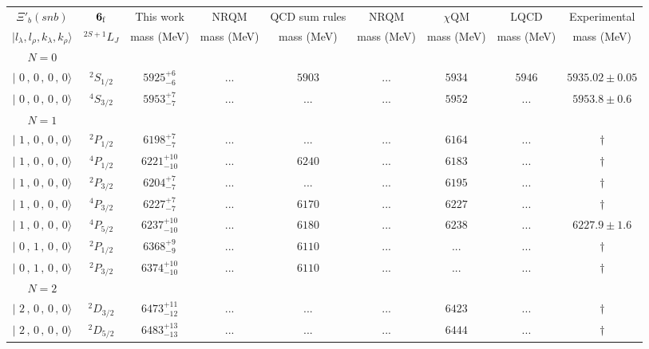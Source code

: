 \begin{tabular}{c c| c c c c c c c}\hline \hline
$\Xi'_{b}(snb)$& ${\bf {6}}_{\rm f}$& This work   &   NRQM \cite{Yoshida2015}     &  QCD sum rules \cite{Liu2008, Mao2015, Chen2016}      &  NRQM \cite{Roberts2008}    & $\chi$QM \cite{Kim2021}        & LQCD \cite{Mohanta2020}     & Experimental  \\ 
 $\vert l_{\lambda}, l_{\rho}, k_{\lambda}, k_{\rho} \rangle$ & $^{2S+1}L_{J}$ & mass (MeV)  &   mass (MeV)  &  mass (MeV)  &  mass (MeV) & mass (MeV) & mass (MeV) &      mass (MeV) \\ \hline
\hline
 $N=0$  &  &  &  &  &  \\ 
$\vert \,\,0\,,\,0\,,\,0\,,\,0 \rangle $ & $^{2}S_{1/2}$ & $5925^{+6}_{-6}$ & ... & $5903$ & ... & $5934$ & $5946$ & $5935.02\pm 0.05$ \\ 
$\vert \,\,0\,,\,0\,,\,0\,,\,0 \rangle $ & $^{4}S_{3/2}$ & $5953^{+7}_{-7}$ & ... & ... & ... & $5952$ & ... & $5953.8\pm 0.6$ \\ 
\hline
 $N=1$  &  &  &  &  &  \\ 
$\vert \,\,1\,,\,0\,,\,0\,,\,0 \rangle $ & $^{2}P_{1/2}$ & $6198^{+7}_{-7}$ & ... & ... & ... & $6164$ & ... & $\dagger$ \\ 
$\vert \,\,1\,,\,0\,,\,0\,,\,0 \rangle $ & $^{4}P_{1/2}$ & $6221^{+10}_{-10}$ & ... & $6240$ & ... & $6183$ & ... & $\dagger$ \\ 
$\vert \,\,1\,,\,0\,,\,0\,,\,0 \rangle $ & $^{2}P_{3/2}$ & $6204^{+7}_{-7}$ & ... & ... & ... & $6195$ & ... & $\dagger$ \\ 
$\vert \,\,1\,,\,0\,,\,0\,,\,0 \rangle $ & $^{4}P_{3/2}$ & $6227^{+7}_{-7}$ & ... & $6170$ & ... & $6227$ & ... & $\dagger$ \\ 
$\vert \,\,1\,,\,0\,,\,0\,,\,0 \rangle $ & $^{4}P_{5/2}$ & $6237^{+10}_{-10}$ & ... & $6180$ & ... & $6238$ & ... & $6227.9\pm 1.6$ \\ 
$\vert \,\,0\,,\,1\,,\,0\,,\,0 \rangle $ & $^{2}P_{1/2}$ & $6368^{+9}_{-9}$ & ... & $6110$ & ... & ... & ... & $\dagger$ \\ 
$\vert \,\,0\,,\,1\,,\,0\,,\,0 \rangle $ & $^{2}P_{3/2}$ & $6374^{+10}_{-10}$ & ... & $6110$ & ... & ... & ... & $\dagger$ \\ 
\hline
 $N=2$  &  &  &  &  &  \\ 
$\vert \,\,2\,,\,0\,,\,0\,,\,0 \rangle $ & $^{2}D_{3/2}$ & $6473^{+11}_{-12}$ & ... & ... & ... & $6423$ & ... & $\dagger$ \\ 
$\vert \,\,2\,,\,0\,,\,0\,,\,0 \rangle $ & $^{2}D_{5/2}$ & $6483^{+13}_{-13}$ & ... & ... & ... & $6444$ & ... & $\dagger$ \\ 

\end{tabular}
